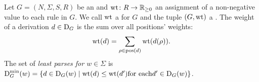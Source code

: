 \documentclass[../../document.tex]{subfiles}
\begin{document}
    \begin{definition}
        Let \(G = (N, \varSigma, S, R)\) be an  and \(\operatorname{wt} \colon R \to \mathbb{R}_{\ge 0}\) an assignment of a non-negative value to each rule in \(G\).
        We call \(\operatorname{wt}\) a  for \(G\) and the tuple \((G, \operatorname{wt})\) a .
        The weight of a derivation \(d \in \operatorname{D}_G\) is the sum over all positions' weights: \[ \operatorname{wt}(d) = \sum_{\rho \in \operatorname{pos}(d)} \operatorname{wt}(d(\rho))\text{.} \]
        The set of \emph{least parses for \(w \in \varSigma\)} is \(\operatorname{D}^{\mathrm{min}}_G(w) = \{ d \in \operatorname{D}_G(w) \mid \operatorname{wt}(d) \leq \operatorname{wt}(d') \text{for each} d' \in \operatorname{D}_G(w) \}\).
    \end{definition}
\end{document}
